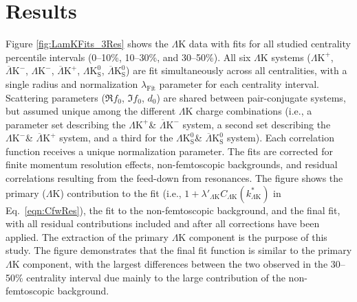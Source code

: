 \documentclass[ALICE,manyauthors]{cernphprep}
\newcommand{\LamK}{$\Lambda$K\xspace}
\newcommand{\LamKchP}{$\Lambda\mathrm{K^{+}}$\xspace}
\newcommand{\ALamKchM}{$\overline{\Lambda}\mathrm{K^{-}}$\xspace}
\newcommand{\LamKchM}{$\Lambda\mathrm{K^{-}}$\xspace}
\newcommand{\ALamKchP}{$\overline{\Lambda}\mathrm{K^{+}}$\xspace}
\newcommand{\LamKs}{$\Lambda\mathrm{K^{0}_{S}}$\xspace}
\newcommand{\ALamKs}{$\overline{\Lambda}\mathrm{K^{0}_{S}}$\xspace}
\begin{document}
\begin{table}[htbp]
\begin{tabular}{l|r}
  \end{tabular}
 \label{tab:LamKSystematics} 
\end{table}




\section{Results}
\label{sec:Results}

Figure \ref{fig:LamKFits_3Res} shows the \LamK data with fits for all studied centrality percentile intervals (0--10\%, 10--30\%, and 30--50\%). 
All six \LamK systems (\LamKchP, \ALamKchM, \LamKchM, \ALamKchP, \LamKs, \ALamKs) are fit simultaneously across all centralities, with a single radius and normalization $\lambda_{\mathrm{Fit}}$ parameter for each centrality interval.
Scattering parameters ($\Re f_{0}$, $\Im f_{0}$, $d_{0}$) are shared between pair-conjugate systems, but assumed unique among the different \LamK charge combinations (i.e., a parameter set describing the \LamKchP \& \ALamKchM system, a second set describing the \LamKchM \& \ALamKchP system, and a third for the \LamKs \& \ALamKs system).
Each correlation function receives a unique normalization parameter.
The fits are corrected for finite momentum resolution effects, non-femtoscopic backgrounds, and residual correlations resulting from the feed-down from resonances.  
The figure shows the primary (\LamK) contribution to the fit (i.e., $1 + \lambda'_{\Lambda\mathrm{K}}C_{\Lambda\mathrm{K}}(k^{*}_{\Lambda\mathrm{K}})$ in Eq.\ \ref{eqn:CfwRes}), the fit to the non-femtoscopic background, and the final fit, with all residual contributions included and after all corrections have been applied.
The extraction of the primary \LamK component is the purpose of this study.
The figure demonstrates that the final fit function is similar to the primary \LamK component, with the largest differences between the two observed in the 30--50\% centrality interval due mainly to the large contribution of the non-femtoscopic background.
\end{document}
